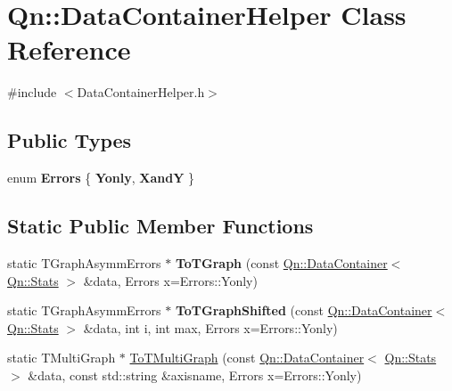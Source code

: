 \hypertarget{classQn_1_1DataContainerHelper}{}\section{Qn\+:\+:Data\+Container\+Helper Class Reference}
\label{classQn_1_1DataContainerHelper}


{\ttfamily \#include $<$Data\+Container\+Helper.\+h$>$}

\subsection*{Public Types}
\begin{DoxyCompactItemize}
\item 
\mbox{\label{classQn_1_1DataContainerHelper_a3fef7832b12b7f7ae4295b3db3e3d53c}} 
enum {\bfseries Errors} \{ {\bfseries Yonly}, 
{\bfseries XandY}
 \}
\end{DoxyCompactItemize}
\subsection*{Static Public Member Functions}
\begin{DoxyCompactItemize}
\item 
\mbox{\label{classQn_1_1DataContainerHelper_a24720e049678f8813ea4fbadf3cef5c7}} 
static T\+Graph\+Asymm\+Errors $\ast$ {\bfseries To\+T\+Graph} (const \mbox{\hyperlink{classQn_1_1DataContainer}{Qn\+::\+Data\+Container}}$<$ \mbox{\hyperlink{classQn_1_1Stats}{Qn\+::\+Stats}} $>$ \&data, Errors x=Errors\+::\+Yonly)
\item 
\mbox{\label{classQn_1_1DataContainerHelper_a11eeefed32d44278be93399d3ae18d09}} 
static T\+Graph\+Asymm\+Errors $\ast$ {\bfseries To\+T\+Graph\+Shifted} (const \mbox{\hyperlink{classQn_1_1DataContainer}{Qn\+::\+Data\+Container}}$<$ \mbox{\hyperlink{classQn_1_1Stats}{Qn\+::\+Stats}} $>$ \&data, int i, int max, Errors x=Errors\+::\+Yonly)
\item 
static T\+Multi\+Graph $\ast$ \mbox{\hyperlink{classQn_1_1DataContainerHelper_ab13b4b0c36c9bfe85dc0041f1f99271f}{To\+T\+Multi\+Graph}} (const \mbox{\hyperlink{classQn_1_1DataContainer}{Qn\+::\+Data\+Container}}$<$ \mbox{\hyperlink{classQn_1_1Stats}{Qn\+::\+Stats}} $>$ \&data, const std\+::string \&axisname, Errors x=Errors\+::\+Yonly)
\end{DoxyCompactItemize}


